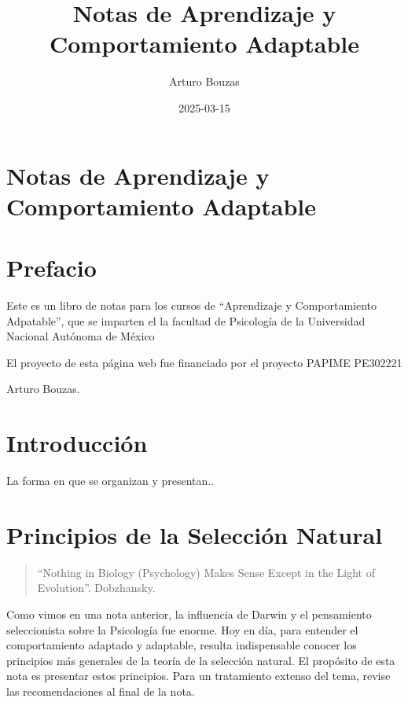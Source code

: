 \documentclass[
  letterpaper,
]{book}
\title{Notas de Aprendizaje y Comportamiento Adaptable}
\author{Arturo Bouzas}
\date{2025-03-15}
\renewcommand*\contentsname{Table of contents}
\newcommand\contentsname{Table of contents}
\begin{document}
\frontmatter
\maketitle

\renewcommand*\contentsname{Table of contents}
{
\hypersetup{linkcolor=}
\setcounter{tocdepth}{2}
\tableofcontents
}
\mainmatter
{}

\chapter{Notas de Aprendizaje y Comportamiento
Adaptable}\label{notas-de-aprendizaje-y-comportamiento-adaptable}


\chapter*{Prefacio}\label{prefacio}


Este es un libro de notas para los cursos de ``Aprendizaje y
Comportamiento Adpatable'', que se imparten el la facultad de Psicología
de la Universidad Nacional Autónoma de México

El proyecto de esta página web fue financiado por el proyecto PAPIME
PE302221

Arturo Bouzas.


\chapter{Introducción}\label{introducciuxf3n}

La forma en que se organizan y presentan..


\chapter{Principios de la Selección
Natural}\label{principios-de-la-selecciuxf3n-natural}

\begin{quote}
``Nothing in Biology (Psychology) Makes Sense Except in the Light of
Evolution''. Dobzhansky.
\end{quote}

Como vimos en una nota anterior, la influencia de Darwin y el
pensamiento seleccionista sobre la Psicología fue enorme. Hoy en día,
para entender el comportamiento adaptado y adaptable, resulta
indispensable conocer los principios más generales de la teoría de la
selección natural. El propósito de esta nota es presentar estos
principios. Para un tratamiento extenso del tema, revise las
recomendaciones al final de la nota.
\end{document}
